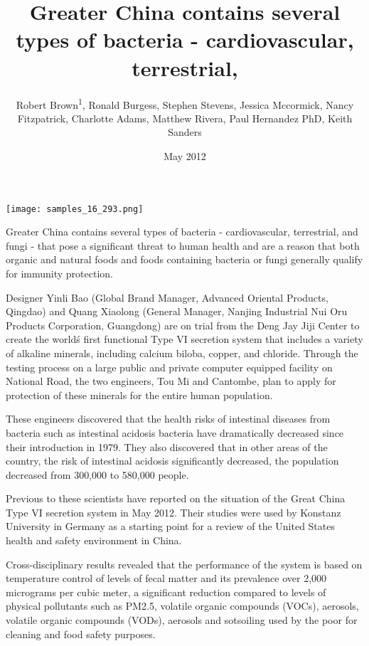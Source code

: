 \documentclass{article}
\title{Greater China contains several types of bacteria - cardiovascular, terrestrial,}
\author{Robert Brown\textsuperscript{1},  Ronald Burgess,  Stephen Stevens,  Jessica Mccormick,  Nancy Fitzpatrick,  Charlotte Adams,  Matthew Rivera,  Paul Hernandez PhD,  Keith Sanders}
\affil{\textsuperscript{1}University of California, Los Angeles}
\date{May 2012}
\begin{document}
\maketitle

\begin{center}
\begin{minipage}{0.75\linewidth}
\texttt{[image: samples\_16\_293.png]}
\end{minipage}
\end{center}

Greater China contains several types of bacteria - cardiovascular, terrestrial, and fungi - that pose a significant threat to human health and are a reason that both organic and natural foods and foods containing bacteria or fungi generally qualify for immunity protection.

Designer Yinli Bao (Global Brand Manager, Advanced Oriental Products, Qingdao) and Quang Xiaolong (General Manager, Nanjing Industrial Nui Oru Products Corporation, Guangdong) are on trial from the Deng Jay Jiji Center to create the world\'s first functional Type VI secretion system that includes a variety of alkaline minerals, including calcium biloba, copper, and chloride. Through the testing process on a large public and private computer equipped facility on National Road, the two engineers, Tou Mi and Cantombe, plan to apply for protection of these minerals for the entire human population.

These engineers discovered that the health risks of intestinal diseases from bacteria such as intestinal acidosis bacteria have dramatically decreased since their introduction in 1979. They also discovered that in other areas of the country, the risk of intestinal acidosis significantly decreased, the population decreased from 300,000 to 580,000 people.

Previous to these scientists have reported on the situation of the Great China Type VI secretion system in May 2012. Their studies were used by Konstanz University in Germany as a starting point for a review of the United States health and safety environment in China.

Cross-disciplinary results revealed that the performance of the system is based on temperature control of levels of fecal matter and its prevalence over 2,000 micrograms per cubic meter, a significant reduction compared to levels of physical pollutants such as PM2.5, volatile organic compounds (VOCs), aerosols, volatile organic compounds (VODs), aerosols and sotsoiling used by the poor for cleaning and food safety purposes.
\end{document}
